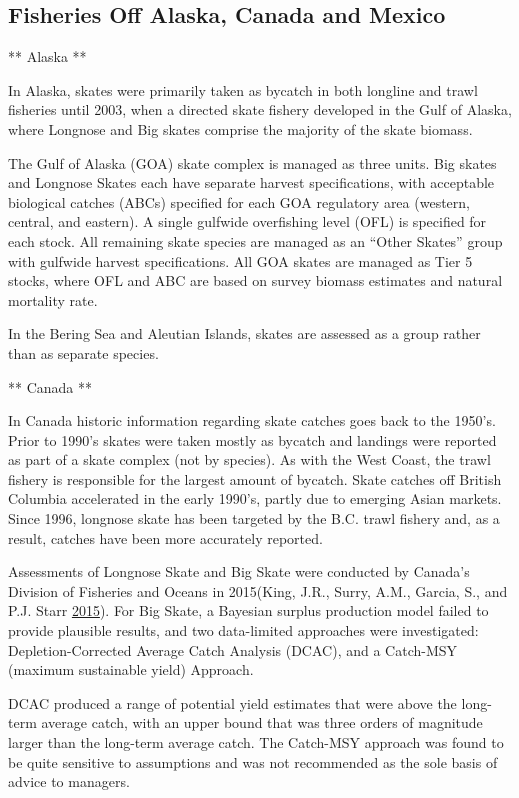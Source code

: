 \documentclass[12pt,]{article}
\begin{document}
\hypertarget{fisheries-off-alaska-canada-and-mexico}{%
\subsection{Fisheries Off Alaska, Canada and
Mexico}\label{fisheries-off-alaska-canada-and-mexico}}

** Alaska **

In Alaska, skates were primarily taken as bycatch in both longline and
trawl fisheries until 2003, when a directed skate fishery developed in
the Gulf of Alaska, where Longnose and Big skates comprise the majority
of the skate biomass.

The Gulf of Alaska (GOA) skate complex is managed as three units. Big
skates and Longnose Skates each have separate harvest specifications,
with acceptable biological catches (ABCs) specified for each GOA
regulatory area (western, central, and eastern). A single gulfwide
overfishing level (OFL) is specified for each stock. All remaining skate
species are managed as an ``Other Skates'' group with gulfwide harvest
specifications. All GOA skates are managed as Tier 5 stocks, where OFL
and ABC are based on survey biomass estimates and natural mortality
rate.

In the Bering Sea and Aleutian Islands, skates are assessed as a group
rather than as separate species.

** Canada **

In Canada historic information regarding skate catches goes back to the
1950's. Prior to 1990's skates were taken mostly as bycatch and landings
were reported as part of a skate complex (not by species). As with the
West Coast, the trawl fishery is responsible for the largest amount of
bycatch. Skate catches off British Columbia accelerated in the early
1990's, partly due to emerging Asian markets. Since 1996, longnose skate
has been targeted by the B.C. trawl fishery and, as a result, catches
have been more accurately reported.

Assessments of Longnose Skate and Big Skate were conducted by Canada's
Division of Fisheries and Oceans in 2015(King, J.R., Surry, A.M.,
Garcia, S., and P.J. Starr \protect\hyperlink{ref-King2015}{2015}). For
Big Skate, a Bayesian surplus production model failed to provide
plausible results, and two data-limited approaches were investigated:
Depletion-Corrected Average Catch Analysis (DCAC), and a Catch-MSY
(maximum sustainable yield) Approach.

DCAC produced a range of potential yield estimates that were above the
long-term average catch, with an upper bound that was three orders of
magnitude larger than the long-term average catch. The Catch-MSY
approach was found to be quite sensitive to assumptions and was not
recommended as the sole basis of advice to managers.
\end{document}
